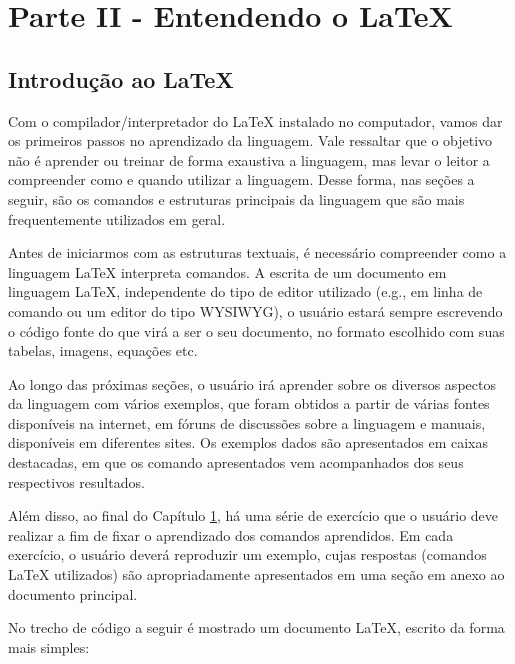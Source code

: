 \chapter{Parte II - Entendendo o \LaTeX{}}
\label{cap:parteII}

\section{Introdução ao \LaTeX{}}
\label{sec:intro_latex}

Com o compilador/interpretador do \LaTeX{} instalado no computador, vamos dar os primeiros passos no aprendizado da linguagem. Vale ressaltar que o objetivo não é aprender ou treinar de forma exaustiva a linguagem, mas levar o leitor a compreender como e quando utilizar a linguagem. Desse forma, nas seções a seguir, são os comandos e estruturas principais da linguagem que são mais frequentemente utilizados em geral.

Antes de iniciarmos com as estruturas textuais, é necessário compreender como a linguagem \LaTeX{} interpreta comandos. A escrita de um documento em linguagem \LaTeX{}, independente do tipo de editor utilizado (e.g., em linha de comando ou um editor do tipo WYSIWYG), o usuário estará sempre escrevendo o código fonte do que virá a ser o seu documento, no formato escolhido com suas tabelas, imagens, equações etc. 

Ao longo das próximas seções, o usuário irá aprender sobre os diversos aspectos da linguagem com vários exemplos, que foram obtidos a partir de várias fontes disponíveis na internet, em fóruns de discussões sobre a linguagem e manuais, disponíveis em diferentes sites. Os exemplos dados são apresentados em caixas destacadas, em que os comando apresentados vem acompanhados dos seus respectivos resultados.

Além disso, ao final do Capítulo \ref{cap:parteII}, há uma série de exercício que o usuário deve realizar a fim de fixar o aprendizado dos comandos aprendidos. Em cada exercício, o usuário deverá reproduzir um exemplo, cujas respostas (comandos \LaTeX{} utilizados) são apropriadamente apresentados em uma seção em anexo ao documento principal.

No trecho de código a seguir é mostrado um documento \LaTeX{}, escrito da forma mais simples:


%
%

